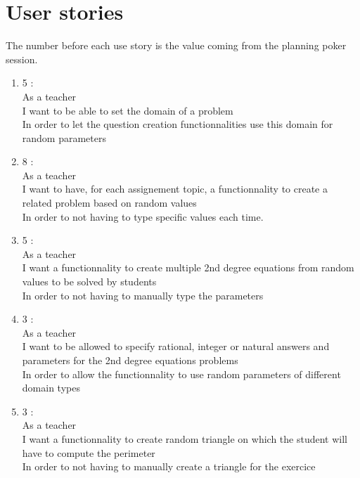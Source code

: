 \documentclass{article}
\begin{document}
\section{User stories}

The number before each use story is the value coming from the planning poker session.\\

\begin{enumerate}



    \item 5 :\\ %
    As a teacher\\
    I want to be able to set the domain of a problem\\
    In order to let the question creation functionnalities use this domain for random parameters\\

    \item 8 :\\ %
    As a teacher\\
    I want to have, for each assignement topic, a functionnality to create a related problem based on random values\\
    In order to not having to type specific values each time.\\

    \item 5 :\\ %
    As a teacher\\
    I want a functionnality to create multiple 2nd degree equations from random values to be solved by students\\
    In order to not having to manually type the parameters\\

    \item 3 :\\ %
    As a teacher\\
    I want to be allowed to specify rational, integer or natural answers and parameters for the 2nd degree equations problems\\
    In order to allow the functionnality to use random parameters of different domain types\\

    \item 3 :\\
    As a teacher\\ %
    I want a functionnality to create random triangle on which the student will have to compute the perimeter\\
    In order to not having to manually create a triangle for the exercice\\


\end{enumerate}
\end{document}
